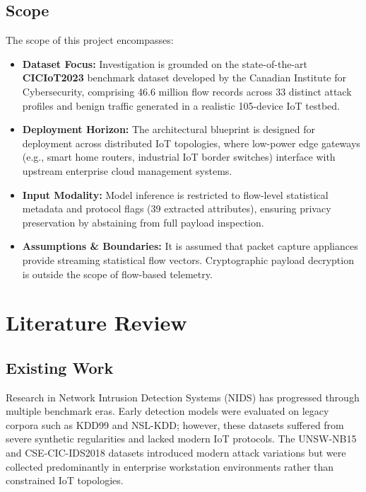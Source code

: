 \documentclass[12pt,a4paper]{report}
\begin{document}
\section{Scope}
The scope of this project encompasses:
\begin{itemize}
    \item \textbf{Dataset Focus:} Investigation is grounded on the state-of-the-art \textbf{CICIoT2023} benchmark dataset developed by the Canadian Institute for Cybersecurity, comprising 46.6 million flow records across 33 distinct attack profiles and benign traffic generated in a realistic 105-device IoT testbed.
    \item \textbf{Deployment Horizon:} The architectural blueprint is designed for deployment across distributed IoT topologies, where low-power edge gateways (e.g., smart home routers, industrial IoT border switches) interface with upstream enterprise cloud management systems.
    \item \textbf{Input Modality:} Model inference is restricted to flow-level statistical metadata and protocol flags (39 extracted attributes), ensuring privacy preservation by abstaining from full payload inspection.
    \item \textbf{Assumptions \& Boundaries:} It is assumed that packet capture appliances provide streaming statistical flow vectors. Cryptographic payload decryption is outside the scope of flow-based telemetry.
\end{itemize}


\chapter{Literature Review}

\section{Existing Work}
Research in Network Intrusion Detection Systems (NIDS) has progressed through multiple benchmark eras. Early detection models were evaluated on legacy corpora such as KDD99 and NSL-KDD; however, these datasets suffered from severe synthetic regularities and lacked modern IoT protocols. The UNSW-NB15 and CSE-CIC-IDS2018 datasets introduced modern attack variations but were collected predominantly in enterprise workstation environments rather than constrained IoT topologies.
\end{document}
